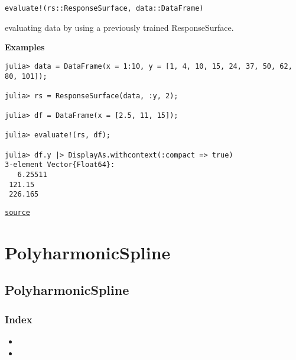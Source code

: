\begin{adjustwidth}{2em}{0pt}


\begin{verbatim}
evaluate!(rs::ResponseSurface, data::DataFrame)
\end{verbatim}

evaluating data by using a previously trained ResponseSurface.

\textbf{Examples}


\begin{verbatim}
julia> data = DataFrame(x = 1:10, y = [1, 4, 10, 15, 24, 37, 50, 62, 80, 101]);

julia> rs = ResponseSurface(data, :y, 2);

julia> df = DataFrame(x = [2.5, 11, 15]);

julia> evaluate!(rs, df);

julia> df.y |> DisplayAs.withcontext(:compact => true)
3-element Vector{Float64}:
   6.25511
 121.15
 226.165
\end{verbatim}



\href{https://github.com/friesischscott/UncertaintyQuantification.jl/blob/f5ee6cce729f0d6a57979257379c942cdf42f86f/src/models/responsesurface.jl#L39-L62}{\texttt{source}}


\end{adjustwidth}

\chapter{PolyharmonicSpline}


\section{PolyharmonicSpline}



\label{14740625054619865040}{}


\subsection{Index}



\label{6663683553518785561}{}

\begin{itemize}
\item {}
\item {}
\end{itemize}


